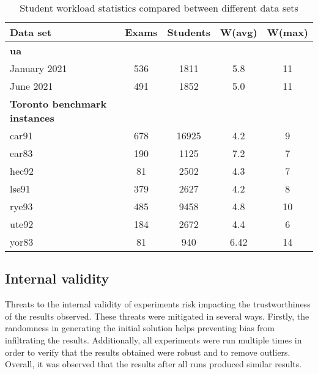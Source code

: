 \begin{table}[H]
	\caption{Student workload statistics compared between different data sets}
	\label{tab:workload_compared}
	\centering
	\begin{tabular}{l c c c c}
		\hline
		\textbf{Data set}& \textbf{Exams} & \textbf{Students} & \textbf{W(avg)} & \textbf{W(max)} \\ \hline
            \textbf{\acrfull{ua}} \\  \hline
		January 2021  & 536 & 1811 & 5.8 & 11 \\
		June 2021 & 491 & 1852 & 5.0 & 11 \\ \hline
              \textbf{Toronto benchmark instances} \\  \hline
		car91  & 678 & 16925 & 4.2 & 9 \\
		ear83 & 190 & 1125 & 7.2 & 7 \\
            hec92 & 81 & 2502 & 4.3 & 7 \\
            lse91 & 379 & 2627 & 4.2 & 8 \\
            rye93 & 485 & 9458 & 4.8 & 10 \\
            ute92 & 184 & 2672 & 4.4 & 6 \\
            yor83  & 81 & 940 & 6.42 & 14 \\ \hline
	\end{tabular}
\end{table}



\subsection{Internal validity}

Threats to the internal validity of experiments risk impacting the trustworthiness of the results observed. These threats were mitigated in several ways. Firstly, the randomness in generating the initial solution helps preventing bias from infiltrating the results. Additionally, all experiments were run multiple times in order to verify that the results obtained were robust and to remove outliers. Overall, it was observed that the results after all runs produced similar results.


